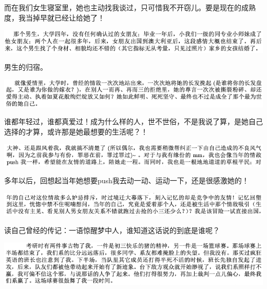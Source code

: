 \documentclass[9pt, b5paper]{article}
\begin{document}
而在我们女生寝室里，她也主动找我谈过，只可惜我不开窃儿。要是现在的成熟度，我当掉早就已经让给她了！

\begin{center}
\includegraphics[width=.9\linewidth]{./pic/backups_plans_20210422_104150.png}
\end{center}

男生的归宿。

\begin{center}
\includegraphics[width=.9\linewidth]{./pic/backups_plans_20210422_103824.png}
\end{center}

谁都年轻过，谁都真爱过！成为什么样的人，世不世俗，不是我说了算，是她自己选择的才算，或许那是她最想要的生活呢？！

\begin{center}
\includegraphics[width=.9\linewidth]{./pic/backups_plans_20210422_104325.png}
\end{center}

多年以后，回想起当年她想要push我去动一动、运动一下，还是很感激她的！

\begin{center}
\includegraphics[width=.9\linewidth]{./pic/backups_plans_20210422_103627.png}
\end{center}

读自己曾经的传记：一语惊醒梦中人，谁知道这话说的到底是谁呢？

\begin{center}
\includegraphics[width=.9\linewidth]{./pic/backups_plans_20210422_095539.png}
\end{center}
\end{document}
